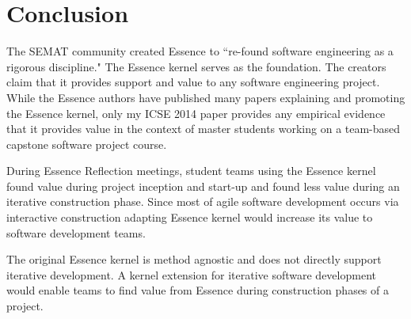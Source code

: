 \documentclass[preprint,12pt,3p]{elsarticle}
\begin{document}


\section{Conclusion}
\label{Conclusions}

The SEMAT community created Essence to ``re-found software engineering as a rigorous discipline." The Essence kernel serves as the foundation. The creators claim that it provides support and value to any software engineering project. While the Essence authors have published many papers explaining and promoting the Essence kernel, only my  ICSE 2014 paper provides any empirical evidence that it provides value in the context of master students working on a team-based capstone software project course. 

During Essence Reflection meetings, student teams using the Essence kernel found value during project inception and start-up and found less value during an iterative construction phase. Since most of agile software development occurs via interactive construction adapting Essence kernel would increase its value to software development teams.

The original Essence kernel is method agnostic and does not directly support iterative development. A kernel extension for iterative software development would enable teams to find value from Essence during construction phases of a project.
\end{document}

